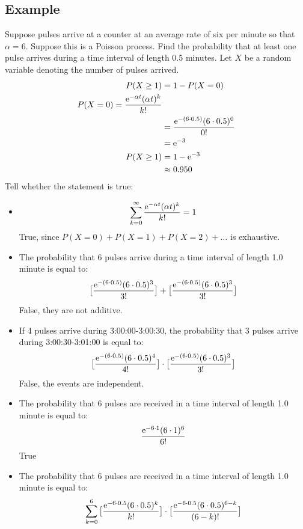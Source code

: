 \documentclass{math}
\begin{document}
\subsection*{Example}
Suppose pulses arrive at a counter at an average rate of six per minute so that
\( \alpha = 6 \). Suppose this is a Poisson process. Find the probability that
at least one pulse arrives during a time interval of length 0.5 minutes. Let
\( X \) be a random variable denoting the number of pulses arrived.
\begin{align*}
  P(X\geq 1) &= 1-P(X=0) \\
  P(X=0) = \frac{\mathrm{e}^{-\alpha t}(\alpha t)^{k}}{k!} \\
  &= \frac{\mathrm{e}^{-(6\cdot 0.5)}(6\cdot 0.5)^{0}}{0!} \\
  &= \mathrm{e}^{-3} \\
  P(X\geq 1) &= 1-\mathrm{e}^{-3} \\
  &\approx 0.950
\end{align*}
Tell whether the statement is true:
\begin{itemize}
  \item
    \[ \sum_{k=0}^{\infty}\frac{\mathrm{e}^{-\alpha t}(\alpha t)^{k}}{k!} = 1 \]
    True, since \( P(X=0)+P(X=1)+P(X=2)+\dots \) is exhaustive.
  \item The probability that 6 pulses arrive during a time interval of length
    1.0 minute is equal to:
    \[ \big[\frac{\mathrm{e}^{-(6\cdot 0.5)}(6\cdot 0.5)^{3}}{3!}\big] +
       \big[\frac{\mathrm{e}^{-(6\cdot 0.5)}(6\cdot 0.5)^{3}}{3!}\big] \]
    False, they are not additive.
  \item If 4 pulses arrive during 3:00:00-3:00:30, the probability that 3 pulses
    arrive during 3:00:30-3:01:00 is equal to:
    \[ \big[\frac{\mathrm{e}^{-(6\cdot 0.5)}(6\cdot 0.5)^{4}}{4!}\big]\cdot
       \big[\frac{\mathrm{e}^{-(6\cdot 0.5)}(6\cdot 0.5)^{3}}{3!}\big] \]
    False, the events are independent.
  \item The probability that 6 pulses are received in a time interval of
    length 1.0 minute is equal to:
    \[ \frac{\mathrm{e}^{-6\cdot 1}(6\cdot 1)^{6}}{6!} \]
    True
  \item The probability that 6 pulses are received in a time interval of
    length 1.0 minute is equal to:
    \[ \sum_{k=0}^{6}\big[\frac{\mathrm{e}^{-6\cdot 0.5}(6\cdot 0.5)^{k}}{k!}\big]\cdot
       \big[\frac{\mathrm{e}^{-6\cdot 0.5}(6\cdot 0.5)^{6-k}}{(6-k)!}\big] \]
\end{itemize}
\end{document}
